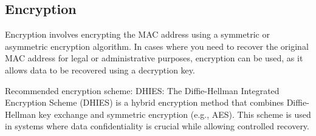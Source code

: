 \documentclass{article}
\begin{document}
  \subsection{\label{subsec:Encryption}Encryption}




  Encryption involves encrypting the MAC address using a symmetric or asymmetric encryption algorithm.
  In cases where you need to recover the original MAC address for legal or administrative purposes,
  encryption can be used, as it allows data to be recovered using a decryption key.

  Recommended encryption scheme: DHIES: The Diffie-Hellman Integrated Encryption Scheme (DHIES) 
  is a hybrid encryption method that combines Diffie-Hellman key exchange and symmetric encryption
  (e.g., AES). This scheme is used in systems where data confidentiality is crucial 
  while allowing controlled recovery.
\end{document}
